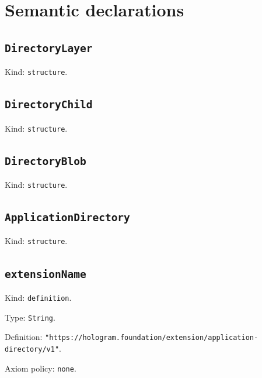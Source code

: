 \documentclass[11pt]{article}
\begin{document}
\section*{Semantic declarations}
\subsection*{\texttt{DirectoryLayer}}
\noindent Kind: \texttt{structure}.\par
\subsection*{\texttt{DirectoryChild}}
\noindent Kind: \texttt{structure}.\par
\subsection*{\texttt{DirectoryBlob}}
\noindent Kind: \texttt{structure}.\par
\subsection*{\texttt{ApplicationDirectory}}
\noindent Kind: \texttt{structure}.\par
\subsection*{\texttt{extensionName}}
\noindent Kind: \texttt{definition}.\par
\noindent Type: \texttt{String}.\par
\noindent Definition: \texttt{"https://hologram.foundation/extension/application-directory/v1"}.\par
\noindent Axiom policy: \texttt{none}.\par
\end{document}
